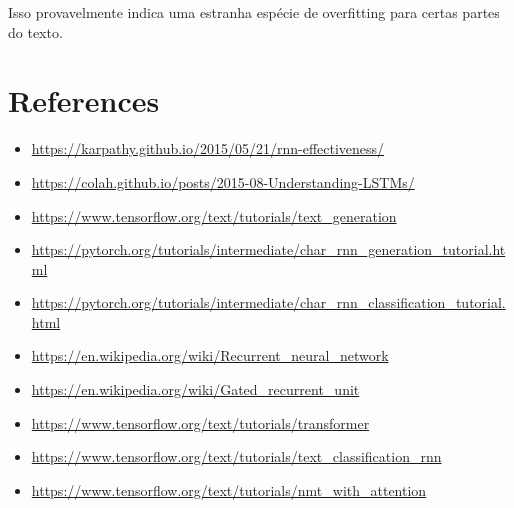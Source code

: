 \documentclass[a4paper,12pt]{article}
\begin{document}
Isso provavelmente indica uma estranha espécie de overfitting para certas partes do texto.



\section{References}
\begin{itemize}
   \item \url{https://karpathy.github.io/2015/05/21/rnn-effectiveness/}
   \item \url{https://colah.github.io/posts/2015-08-Understanding-LSTMs/}
   \item \url{https://www.tensorflow.org/text/tutorials/text_generation}
   \item \url{https://pytorch.org/tutorials/intermediate/char_rnn_generation_tutorial.html}
   \item \url{https://pytorch.org/tutorials/intermediate/char_rnn_classification_tutorial.html}
   \item \url{https://en.wikipedia.org/wiki/Recurrent_neural_network}
   \item \url{https://en.wikipedia.org/wiki/Gated_recurrent_unit}
   \item \url{https://www.tensorflow.org/text/tutorials/transformer}
   \item \url{https://www.tensorflow.org/text/tutorials/text_classification_rnn}
   \item \url{https://www.tensorflow.org/text/tutorials/nmt_with_attention}
\end{itemize}
   
\end{document}
